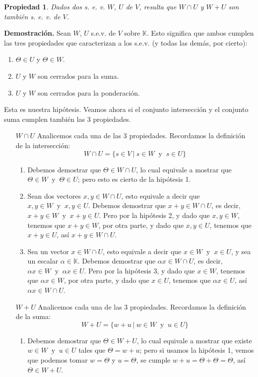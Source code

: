 \documentclass[12pt]{book}
\newtheorem{prop}{Propiedad}
\def\K{\mathbb{K}}
\begin{document}
\begin{prop}
Dados dos s. e. v. $W$, $U$ de $V$, resulta que $W\cap U$ y $W+U$ son tambi\'en s. e. v. de $V$.
\end{prop}
{\bf Demostración.} Sean $W$, $U$ s.e.v. de $V$ sobre $\K$.
Esto significa que ambos cumplen las tres propiedades que caracterizan a los s.e.v. (y todas las demás, por cierto):
\begin{enumerate}
\item $\Theta \in U$ y $\Theta\in W$.
\item $U$ y $W$ son cerrados para la suma.
\item $U$ y $W$ son cerrados para la ponderación.
\end{enumerate}
Esta es nuestra hipótesis.
Veamos ahora si el conjunto intersección y el conjunto suma cumplen también las 3 propiedades.
\begin{itemize}
\item[$W\cap U$] Analicemos cada una de las 3 propiedades. 
Recordamos la definición de la intersección:
\[ W\cap U=\{s\in V\ |\ s\in W\ \textrm{ y }\ s\in U\}\]
\begin{enumerate}
\item Debemos demostrar que $\Theta\in W\cap U$, lo cual equivale a mostrar que $\Theta \in W\ \textrm{ y }\ \Theta\in U$; pero esto es cierto de la hipótesis 1.
\item Sean dos vectores $ x,y \in W\cap U$, esto equivale a decir que  $x,y\in W\ \textrm{ y }\ x,y\in U$.
Debemos demostrar que $x+y\in W\cap U$, es decir,  $x+y\in W\ \textrm{ y }\ x+y\in U$.
Pero por la hipótesis 2, y dado que $x,y\in W$, tenemos que $x+y\in W$, por otra parte, y dado que $x,y\in U$, tenemos que $x+y\in U$, así $x+y\in W\cap U$.
\item Sea un vector $ x \in W\cap U$, esto equivale a decir que  $x\in W\ \textrm{ y }\ x\in U$, y sea un escalar $\alpha\in\K$.
Debemos demostrar que $\alpha x\in W\cap U$, es decir,  $\alpha x\in W\ \textrm{ y }\ \alpha x\in U$.
Pero por la hipótesis 3, y dado que $x\in W$, tenemos que $\alpha x\in W$, por otra parte, y dado que $x\in U$, tenemos que $\alpha x\in U$, así $\alpha x\in W\cap U$.
\end{enumerate}
\item[$W+U$] Analicemos cada una de las 3 propiedades. 
Recordamos la definición de la suma:
\[ W+U=\{w+u\ |\ w\in W\ \textrm{ y }\ u\in U\}\]
\begin{enumerate}
\item Debemos demostrar que $\Theta\in W+ U$, lo cual equivale a mostrar que existe $w\in W\ \textrm{ y }\ u\in U$ tales que $\Theta=w+u$; pero si usamos la hipótesis 1, vemos que podemos tomar $w=\Theta$ y $u=\Theta$, se cumple $w+u=\Theta+\Theta=\Theta$, así $\Theta\in W+U$.

\end{enumerate}
\end{itemize}
\end{document}

